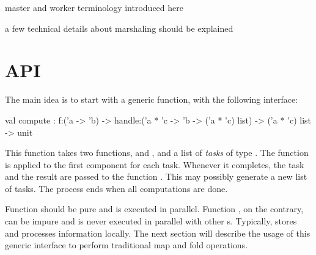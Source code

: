 \documentclass[preprint]{sigplanconf}
\begin{document}
master and worker terminology introduced here

a few technical details about marshaling should be explained

\section{API}

The main idea is to start with a generic function, with the
following interface: 
\begin{ocaml}
  val compute : 
    f:('a -> 'b) -> 
    handle:('a * 'c -> 'b -> ('a * 'c) list) -> 
    ('a * 'c) list -> unit
\end{ocaml}
This function takes two functions,  and , and a
list of \emph{tasks} of type .
The function  is applied to the first component for each task.
Whenever it completes, the task and the result are passed to the
function . This may possibly generate a new list of
tasks. The process ends when all computations are done.

Function  should be pure and is executed in parallel.
Function , on the contrary, can be impure and is never
executed in parallel with other s. Typically,
 stores and processes information locally.
The next section will describe the usage of this generic interface to
perform traditional map and fold operations.
\end{document}
